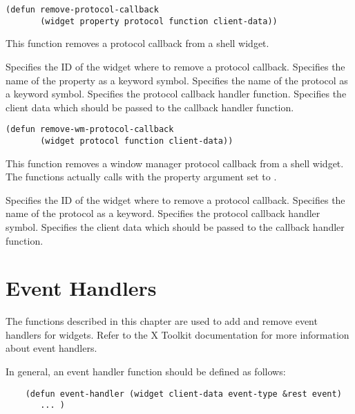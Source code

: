 \begin{lispd}
\syntax\begin{verbatim}
(defun remove-protocol-callback 
       (widget property protocol function client-data))
\end{verbatim}
\beschr This function removes a protocol callback from a shell widget.
\parameter
\begin{paramd}
 Specifies the ID of the widget where to remove 
a protocol callback.
 Specifies the name of the property as a keyword symbol.
 Specifies the name of the protocol as a keyword symbol.
 Specifies the protocol callback handler function.
 Specifies the client data which should be passed to the
callback handler function.
\end{paramd}
\end{lispd}

\begin{lispd}
\syntax\begin{verbatim}
(defun remove-wm-protocol-callback 
       (widget protocol function client-data))
\end{verbatim}
\beschr This function removes a window manager protocol callback from a shell
widget.  The functions actually calls  with the 
property argument set to .
\parameter
\begin{paramd}
 Specifies the ID of the widget where to remove a protocol 
callback.
 Specifies the name of the protocol as a keyword.
 Specifies the protocol callback handler symbol.
 Specifies the client data which should be passed to the
callback handler function.
\end{paramd}
\end{lispd}

\chapter{Event Handlers}

The functions described in this chapter are used to add and remove event
handlers for widgets.  Refer to the X Toolkit documentation for more information
about event handlers. 

In general, an event handler function should be defined as follows:

\begin{verbatim}
    (defun event-handler (widget client-data event-type &rest event)
       ... )
\end{verbatim}


